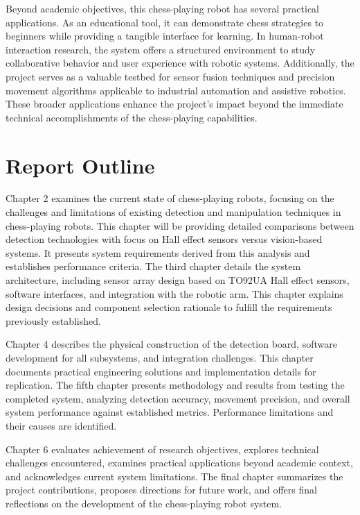 Beyond academic objectives, this chess-playing robot has several practical applications. As an educational tool, it can demonstrate chess strategies to beginners while providing a tangible interface for learning. In human-robot interaction research, the system offers a structured environment to study collaborative behavior and user experience with robotic systems. Additionally, the project serves as a valuable testbed for sensor fusion techniques and precision movement algorithms applicable to industrial automation and assistive robotics. These broader applications enhance the project's impact beyond the immediate technical accomplishments of the chess-playing capabilities.

\section{Report Outline}

Chapter 2 examines the current state of chess-playing robots, focusing on the challenges and limitations of existing detection and manipulation techniques in chess-playing robots. This chapter will be providing detailed comparisons between detection technologies with focus on Hall effect sensors versus vision-based systems. It presents system requirements derived from this analysis and establishes performance criteria. The third chapter details the system architecture, including sensor array design based on TO92UA Hall effect sensors, software interfaces, and integration with the robotic arm. This chapter explains design decisions and component selection rationale to fulfill the requirements previously established.

Chapter 4 describes the physical construction of the detection board, software development for all subsystems, and integration challenges. This chapter documents practical engineering solutions and implementation details for replication.
The fifth chapter presents methodology and results from testing the completed system, analyzing detection accuracy, movement precision, and overall system performance against established metrics. Performance limitations and their causes are identified.

Chapter 6 evaluates achievement of research objectives, explores technical challenges encountered, examines practical applications beyond academic context, and acknowledges current system limitations.
The final chapter summarizes the project contributions, proposes directions for future work, and offers final reflections on the development of the chess-playing robot system.

